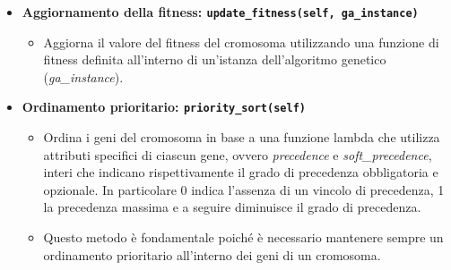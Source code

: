 \begin{itemize}



    \item \textbf{Aggiornamento della fitness: \texttt{update\_fitness(self, ga\_instance)}}
    \begin{itemize}
        \item Aggiorna il valore del fitness del cromosoma utilizzando una funzione di fitness definita all'interno di un'istanza dell'algoritmo genetico (\emph{ga\_instance}).
    \end{itemize}


    \item \textbf{Ordinamento prioritario: \texttt{priority\_sort(self)}}
    \begin{itemize}
        \item Ordina i geni del cromosoma in base a una funzione lambda che utilizza attributi specifici di ciascun gene, ovvero \emph{precedence} e \emph{soft\_precedence}, interi che indicano rispettivamente il grado di precedenza obbligatoria e opzionale. In particolare 0 indica l'assenza di un vincolo di precedenza, 1 la precedenza massima e a seguire diminuisce il grado di precedenza.
        \item Questo metodo è fondamentale poiché è necessario mantenere sempre un ordinamento prioritario all'interno dei geni di un cromosoma.
    \end{itemize}


\end{itemize}
